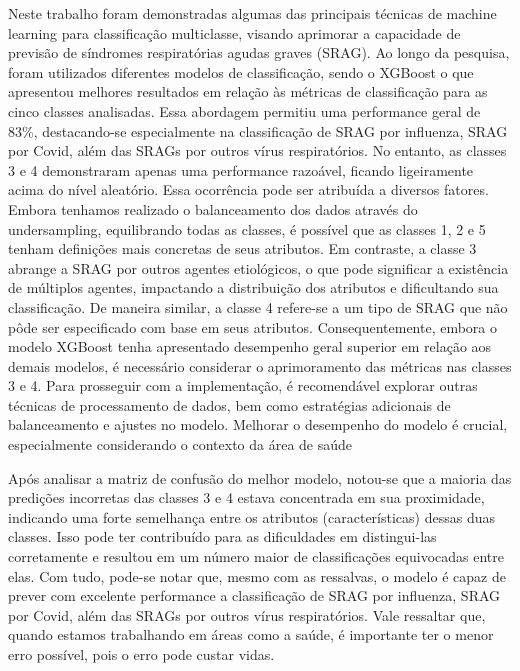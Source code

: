 \documentclass[12pt,oneside,a4paper,chapter=TITLE,
			   english,brazil]{abntex2}
\begin{document}
Neste trabalho  foram  demonstradas algumas das principais técnicas de machine learning para classificação multiclasse, visando aprimorar a capacidade de previsão de síndromes respiratórias agudas graves (SRAG). Ao longo da pesquisa, foram utilizados diferentes modelos de classificação, sendo o XGBoost o que apresentou melhores resultados em relação às métricas de classificação para as cinco classes analisadas. Essa abordagem permitiu uma performance geral de 83\%, destacando-se especialmente na classificação de SRAG por influenza, SRAG por Covid, além das SRAGs por outros vírus respiratórios.  No entanto, as classes 3 e 4 demonstraram apenas uma performance razoável, ficando ligeiramente acima do nível aleatório. Essa ocorrência pode ser atribuída a diversos fatores. Embora tenhamos realizado o balanceamento dos dados através do undersampling, equilibrando todas as classes, é possível que as classes 1, 2 e 5 tenham definições mais concretas de seus atributos. Em contraste, a classe 3 abrange a SRAG por outros agentes etiológicos, o que pode significar a existência de múltiplos agentes, impactando a distribuição dos atributos e dificultando sua classificação. De maneira similar, a classe 4 refere-se a um tipo de SRAG que não pôde ser especificado com base em seus atributos. Consequentemente, embora o modelo XGBoost tenha apresentado desempenho geral superior em relação aos demais modelos, é necessário considerar o aprimoramento das métricas nas classes 3 e 4. Para prosseguir com a implementação, é recomendável explorar outras técnicas de processamento de dados, bem como estratégias adicionais de balanceamento e ajustes no modelo. Melhorar o desempenho do modelo é crucial, especialmente considerando o contexto da área de saúde




 Após analisar a matriz de confusão do melhor modelo, notou-se que a maioria das predições incorretas das classes 3 e 4 estava concentrada em sua proximidade, indicando uma forte semelhança entre os atributos (características) dessas duas classes. Isso pode ter contribuído para as dificuldades em distingui-las corretamente e resultou em um número maior de classificações equivocadas entre elas.  Com tudo, pode-se notar que, mesmo com as ressalvas, o modelo é capaz de prever com excelente performance a classificação de SRAG por influenza, SRAG por Covid, além das SRAGs por outros vírus respiratórios. Vale ressaltar que, quando estamos trabalhando em áreas como a saúde, é importante ter o menor erro possível, pois o erro pode custar vidas.
\end{document}

